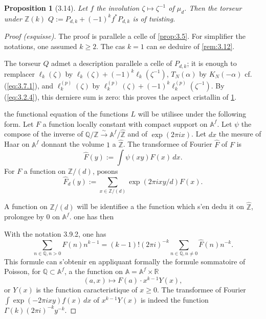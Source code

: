 \documentclass[12pt,a4paper]{article}
\theoremstyle{plain}
\newtheorem{proposition}[theorem]{Proposition}
\theoremstyle{definition}
\theoremstyle{remark}
\begin{document}
\begin{proposition}[3.14]\label{prop:3.14}
Let $f$ the involution $\zeta \mapsto \zeta^{-1}$ of $\mu_d$. Then the torseur under
$\mathbb{Z}(k)$ $Q := P_{d,k} + (-1)^k f^* P_{d,k}$ is of twisting.
\end{proposition}
\begin{proof}[Proof (esquisse)]
The proof is parallele a celle of \ref{prop:3.5}. For simplifier the notations, one
assumed $k \geq 2$. The cas $k = 1$ can se deduire of \ref{rem:3.12}.

The torseur $Q$ admet a description parallele a celle of $P_{d,k}$; it is enough to
remplacer $\ell_k(\zeta)$ by $\ell_k(\zeta) + (-1)^k \ell_k(\zeta^{-1})$,
$T_N(\alpha)$ by $K_N(-\alpha)$ cf. (\ref{eq:3.7.1}), and $\ell_k^{(p)}(\zeta)$ by
$\ell_k^{(p)}(\zeta) + (-1)^k \ell_k^{(p)}(\zeta^{-1})$. By (\ref{eq:3.2.4}), this
derniere sum is zero: this proves the aspect cristallin of \ref{prop:3.14}.

the functional equation of the functions $L$ will be utilisee under the following form. Let
$F$ a function locally constant with compact support on $\mathbb{A}^f$. Let
$\psi$ the compose of the inverse of $\mathbb{Q}/\mathbb{Z} \xrightarrow{\sim}
\mathbb{A}^f/\hat{\mathbb{Z}}$ and of $\exp(2\pi i x)$. Let $dx$ the mesure of Haar on
$\mathbb{A}^f$ donnant the volume $1$ a $\hat{\mathbb{Z}}$. The transformee of Fourier
$\hat{F}$ of $F$ is
\[
\hat{F}(y) := \int \psi(xy) F(x)\, dx.
\]
For $F$ a function on $\mathbb{Z}/(d)$, posons
\[
\hat{F}_d(y) := \sum_{x \in \mathbb{Z}/(d)} \exp(2\pi i xy/d) F(x).
\]

A function on $\mathbb{Z}/(d)$ will be identifiee a the function which s'en dedu it on
$\hat{\mathbb{Z}}$, prolongee by $0$ on $\mathbb{A}^f$. one has then

With the notation 3.9.2, one has
\begin{equation}\label{eq:3.14.1}
\sum_{n \in \mathbb{Q}, n > 0} F(n) n^{k-1} = (k-1)! (2\pi i)^{-k} \sum_{n \in \mathbb{Q},
n \neq 0} \hat{F}(n) n^{-k}.
\end{equation}
This formule can s'obtenir en appliquant formally the formule sommatoire of
Poisson, for $\mathbb{Q} \subset \mathbb{A}^f$, a the function on $\mathbb{A} =
\mathbb{A}^f \times \mathbb{R}$
\[
(a,x) \longmapsto F(a) \cdot x^{k-1} Y(x),
\]
or $Y(x)$ is the function caracteristique of $x \geq 0$. The transformee of Fourier
$\int \exp(-2\pi i xy) f(x)\, dx$ of $x^{k-1} Y(x)$ is indeed the function
$\Gamma(k) (2\pi i)^{-k} y^{-k}$.


\end{proof}
\end{document}
